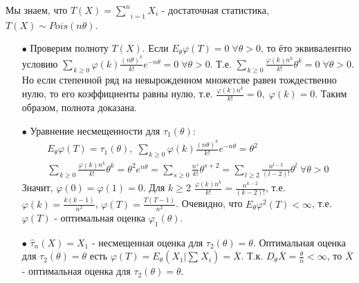 \begin{solution}
	Мы знаем, что $\displaystyle T(X) = \underset{i=1}{\overset{n}{\sum}}X_i$ - достаточная статистика, $T(X) \sim Pois (n \theta)$.
	\begin{itemize}
		\item[$\bullet$]
			Проверим полноту $T(X)$. Если $\displaystyle E_{\theta} \varphi(T) = 0 \; \forall \theta > 0$, то ёто эквивалентно условию $\displaystyle \underset{k \ge 0}{\overset{}{\sum}}\varphi(k) \frac{(n \theta)^k}{k!} e^{-n \theta} = 0 \; \forall \theta > 0$. Т.е. $\displaystyle \underset{k \ge 0}{\overset{}{\sum}}\frac{\varphi(k) n^k}{k!}\theta^k = 0 \; \forall \theta > 0$. Но если степенной ряд на невырожденном множетсве равен тождественно нулю, то его коэффициенты равны нулю, т.е. $\displaystyle \frac{\varphi(k) n^k}{k!} = 0, \; \varphi(k) = 0$. Таким образом, полнота доказана.
		\item[$\bullet$]
			Уравнение несмещенности для $\tau_1 (\theta)$:
			$$\begin{gathered}
				E_{\theta} \varphi(T) = \tau_1 (\theta), \; \underset{k \ge 0}{\overset{}{\sum}}\varphi(k) \frac{(n \theta)^k}{k!} e^{- n \theta} = \theta^2 \\
				\underset{k \ge 0}{\overset{}{\sum}}\frac{\varphi(k) n^k}{k!} \theta^k = \theta^2 e^{n \theta} = \underset{s \ge 0}{\overset{}{\sum}}\frac{n^s}{k!}\theta^{s+2} = \underset{l \ge 2}{\overset{}{\sum}}\frac{n^{l-2}}{(l-2)!}\theta^l \; \forall \theta > 0
			\end{gathered}$$
			Значит, $\varphi(0) = \varphi(1) = 0$. Для $k \ge 2$ $\displaystyle \frac{\varphi(k) n^k}{k!} = \frac{n^{k-2}}{(k-2)!}$, т.е. $\displaystyle \varphi(k) = \frac{k(k-1)}{n^2}$, $\displaystyle \varphi(T) = \frac{T(T-1)}{n^2}$. Очевидно, что $\displaystyle E_{\theta} \varphi^2(T) < \infty$, т.е. $\varphi(T)$ - оптимальная оценка $\varphi_1(\theta)$.
		\item[$\bullet$]
			$\hat{\tau}_n (X) = X_1$ - несмещенная оценка для $\tau_2(\theta) = \theta$. Оптимальная оценка для $\tau_2(\theta) = \theta$ есть $\displaystyle \varphi(T) = E_{\theta} (X_1 | \underset{}{\overset{}{\sum}}X_i) = \overline{X}$. Т.к. $\displaystyle D_{\theta}\overline{X} = \frac{\theta}{n} < \infty$, то $\overline{X}$ - оптимальная оценка для $\tau_2(\theta) = \theta$.
	\end{itemize}
\end{solution}

